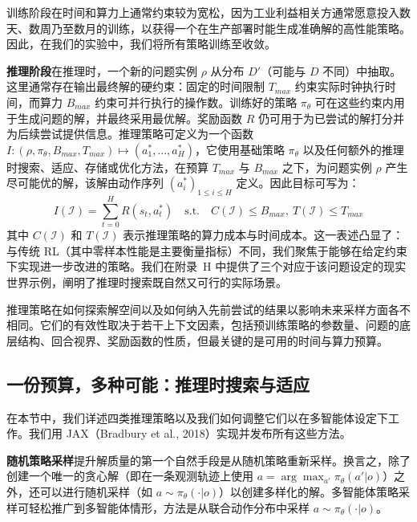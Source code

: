 \documentclass[11pt,UTF8,fontset=fandol]{ctexart}
\begin{document}
训练阶段在时间和算力上通常约束较为宽松，因为工业利益相关方通常愿意投入数天、数周乃至数月的训练，以获得一个在生产部署时能生成准确解的高性能策略。因此，在我们的实验中，我们将所有策略训练至收敛。

\textbf{推理阶段}\quad 在推理时，一个新的问题实例 $\rho$ 从分布 $D'$（可能与 $D$ 不同）中抽取。这里通常存在输出最终解的硬约束：固定的时间限制 $T_{max}$ 约束实际时钟执行时间，而算力 $B_{max}$ 约束可并行执行的操作数。训练好的策略 $\pi_\theta$ 可在这些约束内用于生成问题的解，并最终采用最优解。奖励函数 $R$ 仍可用于为已尝试的解打分并为后续尝试提供信息。推理策略可定义为一个函数 $I : (\rho, \pi_\theta, B_{max}, T_{max}) \mapsto (a_1^*, ..., a_H^*)$，它使用基础策略 $\pi_\theta$ 以及任何额外的推理时搜索、适应、存储或优化方法，在预算 $T_{max}$ 与 $B_{max}$ 之下，为问题实例 $\rho$ 产生尽可能优的解，该解由动作序列 $(a_i^*)_{1 \le i \le H}$ 定义。因此目标可写为：
\[
I(\mathcal{I}) = \sum_{t=0}^{H} R(s_t, a_t^*) \quad \text{s.t.} \quad C(\mathcal{I}) \le B_{max}, \ T(\mathcal{I}) \le T_{max}
\]
其中 $C(\mathcal{I})$ 和 $T(\mathcal{I})$ 表示推理策略的算力成本与时间成本。这一表述凸显了：与传统 RL（其中零样本性能是主要衡量指标）不同，我们聚焦于能够在给定约束下实现进一步改进的策略。我们在附录~H 中提供了三个对应于该问题设定的现实世界示例，阐明了推理时搜索既自然又可行的实际场景。

推理策略在如何探索解空间以及如何纳入先前尝试的结果以影响未来采样方面各不相同。它们的有效性取决于若干上下文因素，包括预训练策略的参数量、问题的底层结构、回合视界、奖励函数的性质，但最关键的是可用的时间与算力预算。

\subsection{一份预算，多种可能：推理时搜索与适应}

在本节中，我们详述四类推理策略以及我们如何调整它们以在多智能体设定下工作。我们用 JAX（Bradbury et al., 2018）实现并发布所有这些方法。

\textbf{随机策略采样}\quad 提升解质量的第一个自然手段是从随机策略重新采样。换言之，除了创建一个唯一的贪心解（即在一条观测轨迹上使用 $a = \arg\max_{a'} \pi_\theta(a'|o)$）之外，还可以进行随机采样（如 $a \sim \pi_\theta(\cdot|o)$）以创建多样化的解。多智能体策略采样可轻松推广到多智能体情形，方法是从联合动作分布中采样 $a \sim \pi_\theta(\cdot|o)$。
\end{document}
